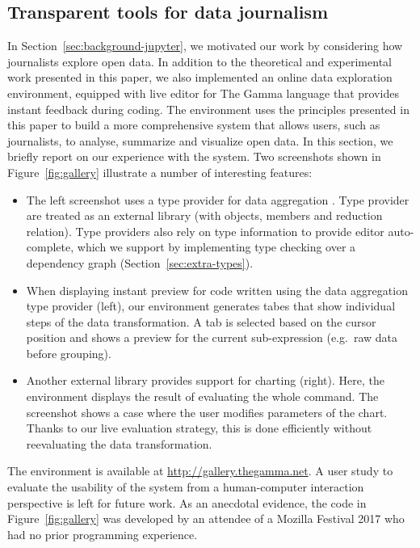 \documentclass[english,crc]{programming}
\theoremstyle{plain}
\theoremstyle{definition}
\begin{document}

\subsection{Transparent tools for data journalism}
\label{sec:evaluation-case}

In Section~\ref{sec:background-jupyter}, we motivated our work by considering how journalists
explore open data. In addition to the theoretical and experimental work presented in this paper,
we also implemented an online data exploration environment, equipped with live editor for The
Gamma language that provides instant feedback during coding. The environment uses the
principles presented in this paper to build a more comprehensive system that allows users,
such as journalists, to analyse, summarize and visualize open data. In this section, we briefly
report on our experience with the system. Two screenshots shown
in Figure~\ref{fig:gallery} illustrate a number of interesting features:

\begin{itemize}
\item The left screenshot uses a type provider for data aggregation \cite{gamma}.
  Type provider are treated as an external library
  (with objects, members and reduction relation). Type providers also rely on type information to
  provide editor auto-complete, which we support by implementing type checking over a
  dependency graph (Section~\ref{sec:extra-types}).

\item When displaying instant preview for code written using the data aggregation type provider (left),
  our environment generates tabes that show individual steps of the data transformation.
  A tab is selected based on the cursor position and shows a preview for the current sub-expression
  (e.g.~raw data before grouping).

\item Another external library provides support for charting (right). Here, the environment
  displays the result of evaluating the whole command. The screenshot shows a case where the user
  modifies parameters of the chart. Thanks to our live evaluation
  strategy, this is done efficiently without reevaluating the data transformation.
\end{itemize}

\noindent
The environment is available at \url{http://gallery.thegamma.net}.
A user study to evaluate the usability of the system from a human-computer interaction perspective
is left for future work. As an anecdotal evidence, the code in
Figure~\ref{fig:gallery} was developed by an attendee of a Mozilla Festival 2017
who had no prior programming experience.
\end{document}
